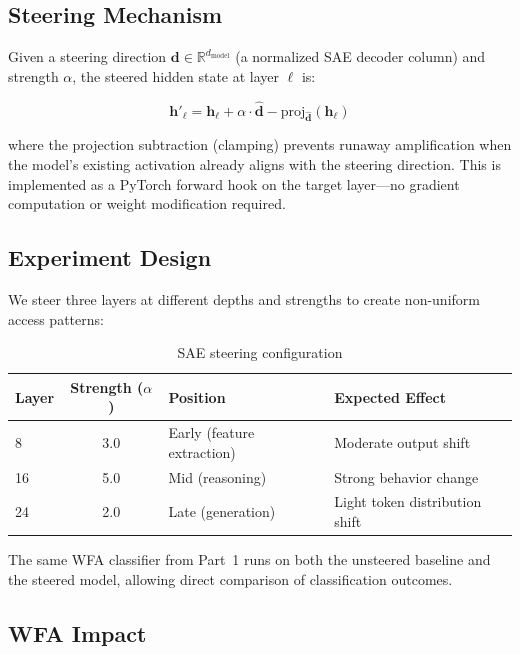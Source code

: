 \documentclass[11pt,letterpaper]{article}
\begin{document}
\subsection{Steering Mechanism}

Given a steering direction $\mathbf{d} \in \mathbb{R}^{d_\text{model}}$ (a normalized SAE decoder column) and strength $\alpha$, the steered hidden state at layer $\ell$ is:

\begin{equation}
    \mathbf{h}'_\ell = \mathbf{h}_\ell + \alpha \cdot \hat{\mathbf{d}} - \text{proj}_{\hat{\mathbf{d}}}(\mathbf{h}_\ell)
    \label{eq:steering}
\end{equation}

where the projection subtraction (clamping) prevents runaway amplification when the model's existing activation already aligns with the steering direction. This is implemented as a PyTorch forward hook on the target layer---no gradient computation or weight modification required.

\subsection{Experiment Design}

We steer three layers at different depths and strengths to create non-uniform access patterns:

\begin{table}[htbp]
\centering
\caption{SAE steering configuration}
\label{tab:steering-config}
\begin{tabular}{@{}lcll@{}}
\toprule
\textbf{Layer} & \textbf{Strength ($\alpha$)} & \textbf{Position} & \textbf{Expected Effect} \\
\midrule
8  & 3.0 & Early (feature extraction) & Moderate output shift \\
16 & 5.0 & Mid (reasoning) & Strong behavior change \\
24 & 2.0 & Late (generation) & Light token distribution shift \\
\bottomrule
\end{tabular}
\end{table}

The same WFA classifier from Part~1 runs on both the unsteered baseline and the steered model, allowing direct comparison of classification outcomes.

\subsection{WFA Impact}
\end{document}
